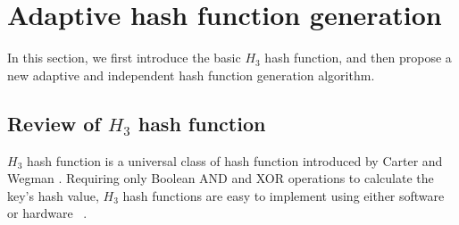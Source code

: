 \documentclass[10pt,journal,compsoc]{IEEEtran}
\newcommand{\rev}[1]{#1}
\newcommand{\note}[1]{{\sffamily\itshape\bfseries\uline{#1}}}
\begin{document}
%
%



\section{Adaptive hash function generation}
\label{sec:Adaptive Hash function Generation}
In this section,
we first  introduce the basic $H_3$ hash function, and then propose a new adaptive and \rev{independent} hash function generation algorithm.


\subsection{Review of $H_3$ hash function}
\label{subsec:The review of $H_3$ hash function}
$H_3$ hash function is a universal class of hash function introduced by Carter and Wegman \cite{carter1979universal}.
 Requiring only Boolean AND and XOR operations to calculate the key's hash value, $H_3$ hash functions are easy to implement using either software or hardware ~\cite{ramakrishna1997efficient,ramakrishna1991perfect}.
\end{document}
